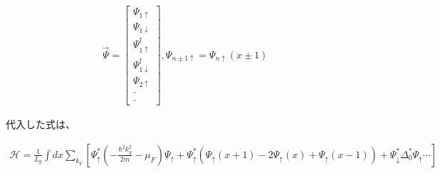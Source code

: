 \documentclass{jsarticle}
\begin{document}
		\begin{align}
			\vec{\Psi}=
			\begin{bmatrix}
				\Psi_{1\uparrow} \\
				\Psi_{1\downarrow} \\
				\Psi_{1\uparrow}^\dagger \\
				\Psi_{1\downarrow}^\dagger \\
				\Psi_{2\uparrow} \\
				\cdot \\
				\cdot
			\end{bmatrix},
			\Psi_{n\pm 1\uparrow}=\Psi_{n\uparrow}\left(x\pm 1\right)
		\end{align}

		代入した式は、

		\begin{align}
			\mathcal{H}= \frac{1}{L_y}\int dx \sum_{k_y}
			\left[ \Psi^\ast_\uparrow \left( -\frac{\hbar^2k_y^2}{2m}-\mu_F \right)\Psi_\uparrow
			+\Psi^\ast_\uparrow \left( \Psi_\uparrow\left(x+1\right)-2\Psi_\uparrow\left(x\right)+\Psi_\uparrow\left(x-1\right)
			\right)+\Psi^\ast_\downarrow \Delta_0^\ast \Psi_\uparrow \cdots
			\right]
			\label{hamil3}
		\end{align}
\end{document}
